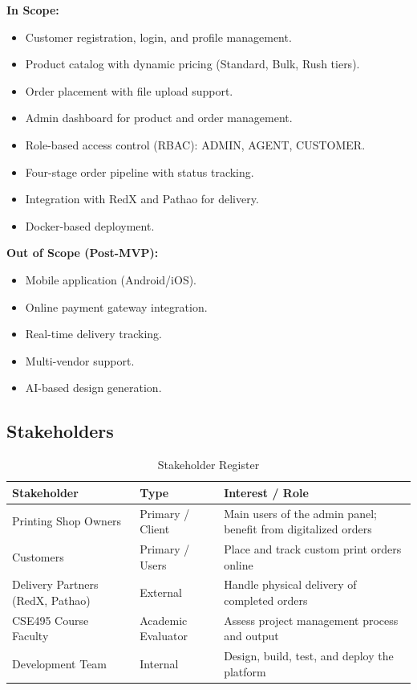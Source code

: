 \documentclass[12pt,a4paper]{report}
\begin{document}
\textbf{In Scope:}
\begin{itemize}
  \item Customer registration, login, and profile management.
  \item Product catalog with dynamic pricing (Standard, Bulk, Rush tiers).
  \item Order placement with file upload support.
  \item Admin dashboard for product and order management.
  \item Role-based access control (RBAC): ADMIN, AGENT, CUSTOMER.
  \item Four-stage order pipeline with status tracking.
  \item Integration with RedX and Pathao for delivery.
  \item Docker-based deployment.
\end{itemize}

\textbf{Out of Scope (Post-MVP):}
\begin{itemize}
  \item Mobile application (Android/iOS).
  \item Online payment gateway integration.
  \item Real-time delivery tracking.
  \item Multi-vendor support.
  \item AI-based design generation.
\end{itemize}

\subsection{Stakeholders}

\begin{table}[H]
  \centering
  \caption{Stakeholder Register}
  \begin{tabularx}{\textwidth}{L{3.5cm} L{3cm} X}
    \toprule
    \textbf{Stakeholder} & \textbf{Type} & \textbf{Interest / Role} \\
    \midrule
    Printing Shop Owners  & Primary / Client   & Main users of the admin panel; benefit from digitalized orders \\
    Customers             & Primary / Users    & Place and track custom print orders online \\
    Delivery Partners (RedX, Pathao) & External & Handle physical delivery of completed orders \\
    CSE495 Course Faculty & Academic Evaluator & Assess project management process and output \\
    Development Team      & Internal           & Design, build, test, and deploy the platform \\
    \bottomrule
  \end{tabularx}
\end{table}
\end{document}
